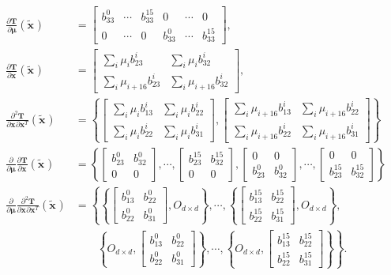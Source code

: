 \documentclass[]{article}
\newcommand{\vT}{\bm{T}}
\newcommand{\vmu}{\bm{\mu}}
\newcommand{\vx}[1][]{\bm{x}_{#1}}
\newcommand{\vxt}[1][]{\bm{\widetilde x}_{#1}}
\newcommand{\D}[2]{\frac{\partial #1}{\partial #2}}
\newcommand{\Dd}[3]{\frac{\partial^2 #1}{\partial #2 \partial #3}}
\begin{document}
\begin{align}
\D{\vT}{\vmu}(\vxt) &= \begin{bmatrix} b_{33}^{0} & \cdots &
b_{33}^{15} & 0 & \cdots & 0 \\ 0 & \cdots & 0 & b_{33}^{0} &
\cdots & b_{33}^{15} \end{bmatrix}, \\
\D{\vT}{\vx}(\vxt) &= \begin{bmatrix} \sum_i \mu_i b_{23}^i & \sum_i
\mu_i b_{32}^i \\ \sum_i \mu_{i+16} b_{23}^{i} & \sum_i
\mu_{i+16} b_{32}^{i} \end{bmatrix}, \\
\Dd{\vT}{\vx}{\vx^T}(\vxt) &= \left\{ \begin{bmatrix} \sum_i \mu_i
b_{13}^i & \sum_i \mu_i b_{22}^i \\ \sum_i \mu_{i} b_{22}^{i} &
\sum_i \mu_{i} b_{31}^{i} \end{bmatrix}, \begin{bmatrix} \sum_i
\mu_{i+16} b_{13}^{i} & \sum_i \mu_{i+16} b_{22}^{i} \\ \sum_i
\mu_{i+16} b_{22}^{i} & \sum_i \mu_{i+16} b_{31}^{i}
\end{bmatrix} \right\} \\
\D{}{\vmu} \D{\vT}{\vx}(\vxt) &= \left\{ \begin{bmatrix} b_{23}^{0}
& b_{32}^{0} \\ 0 & 0 \end{bmatrix}, \cdots, \begin{bmatrix}
b_{23}^{15} & b_{32}^{15} \\ 0 & 0 \end{bmatrix}, \begin{bmatrix} 0
& 0 \\ b_{23}^{0} & b_{32}^{0} \end{bmatrix}, \cdots,
\begin{bmatrix} 0 & 0 \\ b_{23}^{15} & b_{32}^{15} \end{bmatrix} \right\}
\\
\D{}{\vmu} \Dd{\vT}{\vx}{\vx^T}(\vxt) &= \left\{ \left\{
\begin{bmatrix} b_{13}^0 & b_{22}^0 \\ b_{22}^0 & b_{31}^0 \end{bmatrix},
O_{d \times d} \right\}, \cdots, \left\{ \begin{bmatrix} b_{13}^{15}
& b_{22}^{15} \\ b_{22}^{15} & b_{31}^{15} \end{bmatrix}, O_{d
\times d} \right\}, \right. \\
& \qquad \left. \left\{ O_{d \times d},
\begin{bmatrix} b_{13}^{0} & b_{22}^{0} \\ b_{22}^{0} &
b_{31}^{0} \end{bmatrix} \right\}, \cdots, \left\{ O_{d \times d},
\begin{bmatrix} b_{13}^{15} & b_{22}^{15} \\ b_{22}^{15} &
b_{31}^{15} \end{bmatrix} \right\} \right\}.
\end{align}
\end{document}
